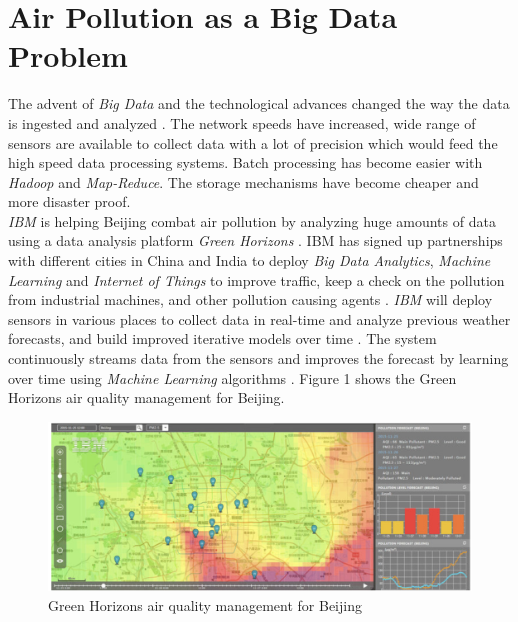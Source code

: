 \documentclass[sigconf]{acmart}
\begin{document}
\section{Air Pollution as a Big Data Problem}
The advent of {\em Big Data} and the technological advances changed the way the data is ingested and analyzed \cite{www-ibm1}. The network speeds have increased, wide range of sensors are available to collect data with a lot of precision which would feed the high speed data processing systems. Batch processing has become easier with {\em Hadoop} and {\em Map-Reduce}. The storage mechanisms have become cheaper and more disaster proof. \\
{\em IBM} is helping Beijing combat air pollution by analyzing huge amounts of data using a data analysis platform {\em Green Horizons} \cite{www-huff}. IBM has signed up partnerships with different cities in China and India to deploy {\em Big Data Analytics}, {\em Machine Learning} and {\em Internet of Things} to improve traffic, keep a check on the pollution from industrial machines, and other pollution causing agents \cite{www-huff}. {\em IBM} will deploy sensors in various places to collect data in real-time and analyze previous weather forecasts, and build improved iterative models over time \cite{www-huff}. The system continuously streams data from the sensors and improves the forecast by learning over time using {\em Machine Learning} algorithms \cite{www-huff}. Figure 1 shows the Green Horizons air quality management for Beijing.

\begin{figure}
\includegraphics[width=1.0\textwidth]{images/fig1.png}
\caption{Green Horizons air quality management for Beijing \cite{www-huff}}
\end{figure}
\end{document}

